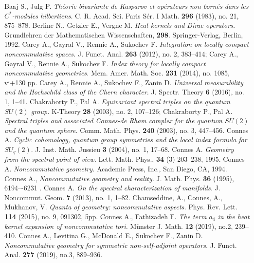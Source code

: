 \documentclass[12pt]{article}
\begin{document}
\small

\begin{thebibliography}{99}
\setlength{\itemsep}{0pt}
\setlength{\parskip}{0pt}
\setlength{\parsep}{0pt}
 Baaj S., Julg P. {\it Th\'eorie bivariante de Kasparov et op\'erateurs non born\'es dans les $C^*$-modules hilbertiens.} C. R. Acad. Sci. Paris S\'er. I Math. {\bf 296} (1983), no. 21, 875--878.
 Berline N., Getzler E., Vergne M. {\it Heat kernels and Dirac operators.} Grundlehren der Mathematischen Wissenschaften, {\bf 298}. Springer-Verlag, Berlin, 1992.
 Carey A., Gayral V., Rennie A., Sukochev F. {\it Integration on locally compact noncommutative spaces.} J. Funct. Anal. {\bf 263} (2012), no. 2, 383--414; Carey A., Gayral V., Rennie A., Sukochev F. {\it Index theory for locally compact noncommutative geometries.} Mem. Amer. Math. Soc. {\bf 231} (2014), no. 1085, vi+130 pp.
 Carey A., Rennie A., Sukochev F., Zanin D. {\it Universal measurability and the Hochschild class of the Chern character.} J. Spectr. Theory {\bf 6} (2016), no. 1, 1--41.
 Chakraborty P., Pal A. {\it Equivariant spectral triples on the quantum $SU(2)$ group.} K-Theory {\bf 28} (2003), no. 2, 107--126;  Chakraborty P., Pal A. {\it Spectral triples and associated Connes-de Rham complex for the quantum $SU(2)$ and the quantum sphere.} Comm. Math. Phys. {\bf 240} (2003), no. 3, 447--456.
 Connes A. {\it Cyclic cohomology, quantum group symmetries and the local index formula for $SU_q(2).$} J. Inst. Math. Jussieu {\bf 3} (2004), no. 1, 17--68.
 Connes A. {\it Geometry from the spectral point of view.} Lett. Math. Phys., {\bf 34} (3) 203--238, 1995.
  Connes A. {\it Noncommutative geometry.} Academic Press, Inc., San Diego, CA, 1994.
 Connes A., {\it Noncommutative geometry and reality.} J. Math. Phys. {\bf 36} (1995), 6194–-6231 .
 Connes A. {\it On the spectral characterization of manifolds.} J. Noncommut. Geom. {\bf 7} (2013), no. 1, 1--82.
 Chamseddine, A., Connes, A., Mukhanov, V. {\it Quanta of geometry: noncommutative aspects.} Phys. Rev. Lett. {\bf 114} (2015), no. 9, 091302, 5pp.
 Connes A., Fathizadeh F. {\it The term $a_4$ in the heat kernel expansion of noncommutative tori.} M\"unster J. Math. {\bf 12} (2019), no.2, 239--410.
 Connes A., Levitina G., McDonald E., Sukochev F., Zanin D. {\it Noncommutative geometry for symmetric non-self-adjoint operators.} J. Funct. Anal. {\bf 277} (2019), no.3, 889--936.

\end{thebibliography}
\end{document}
